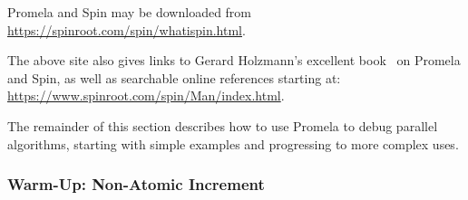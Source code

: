 Promela and Spin may be downloaded from
\url{https://spinroot.com/spin/whatispin.html}.

The above site also gives links to Gerard Holzmann's excellent
book~\cite{Holzmann03a} on Promela and Spin,
as well as searchable online references starting at:
\url{https://www.spinroot.com/spin/Man/index.html}.

The remainder of this section describes how to use Promela to debug
parallel algorithms, starting with simple examples and progressing to
more complex uses.

\subsubsection{Warm-Up:
			Non-Atomic Increment}
\label{sec:formal:Warm-Up: Non-Atomic Increment}


